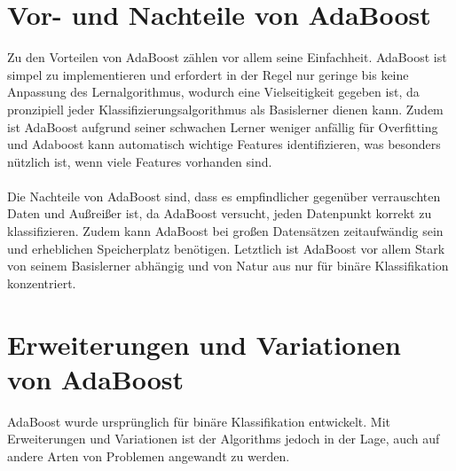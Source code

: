 \documentclass[11pt,a4paper,oneside]{scrartcl}
\begin{document}
\section{Vor- und Nachteile von AdaBoost}
Zu den Vorteilen von AdaBoost zählen vor allem seine Einfachheit. AdaBoost ist simpel zu
implementieren und erfordert in der Regel nur geringe bis keine Anpassung des Lernalgorithmus,
wodurch eine Vielseitigkeit gegeben ist, da pronzipiell jeder Klassifizierungsalgorithmus
als Basislerner dienen kann.
Zudem ist AdaBoost aufgrund seiner schwachen Lerner weniger anfällig für Overfitting und Adaboost
kann automatisch wichtige Features identifizieren, was besonders nützlich ist, wenn viele
Features vorhanden sind.\\\\
Die Nachteile von AdaBoost sind, dass es empfindlicher gegenüber verrauschten Daten und Außreißer
ist, da AdaBoost versucht, jeden Datenpunkt korrekt zu klassifizieren. Zudem kann AdaBoost bei
großen Datensätzen zeitaufwändig sein und erheblichen Speicherplatz benötigen. Letztlich
ist AdaBoost vor allem Stark von seinem Basislerner abhängig und von Natur aus nur für
binäre Klassifikation konzentriert.
\section{Erweiterungen und Variationen von AdaBoost}
AdaBoost wurde ursprünglich für binäre Klassifikation entwickelt. Mit Erweiterungen und
Variationen ist der Algorithms jedoch in der Lage, auch auf andere Arten von Problemen
angewandt zu werden.
\end{document}
